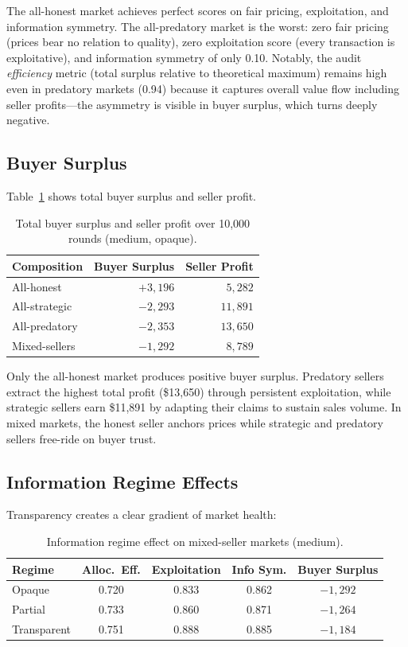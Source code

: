 \documentclass[11pt]{article}
\begin{document}
The all-honest market achieves perfect scores on fair pricing, exploitation, and information symmetry.
The all-predatory market is the worst: zero fair pricing (prices bear no relation to quality), zero exploitation score (every transaction is exploitative), and information symmetry of only 0.10.
Notably, the audit \emph{efficiency} metric (total surplus relative to theoretical maximum) remains high even in predatory markets (0.94) because it captures overall value flow including seller profits---the asymmetry is visible in buyer surplus, which turns deeply negative.

\subsection{Buyer Surplus}

Table~\ref{tab:surplus} shows total buyer surplus and seller profit.

\begin{table}[h]
\centering
\caption{Total buyer surplus and seller profit over 10{,}000 rounds (medium, opaque).}
\label{tab:surplus}
\begin{tabular}{lrr}
\toprule
Composition & Buyer Surplus & Seller Profit \\
\midrule
All-honest    & $+3{,}196$ & $5{,}282$ \\
All-strategic & $-2{,}293$ & $11{,}891$ \\
All-predatory & $-2{,}353$ & $13{,}650$ \\
Mixed-sellers & $-1{,}292$ & $8{,}789$ \\
\bottomrule
\end{tabular}
\end{table}

Only the all-honest market produces positive buyer surplus.
Predatory sellers extract the highest total profit (\$13{,}650) through persistent exploitation, while strategic sellers earn \$11{,}891 by adapting their claims to sustain sales volume.
In mixed markets, the honest seller anchors prices while strategic and predatory sellers free-ride on buyer trust.

\subsection{Information Regime Effects}

Transparency creates a clear gradient of market health:

\begin{table}[h]
\centering
\caption{Information regime effect on mixed-seller markets (medium).}
\label{tab:regime}
\begin{tabular}{lcccc}
\toprule
Regime & Alloc.\ Eff. & Exploitation & Info Sym. & Buyer Surplus \\
\midrule
Opaque      & 0.720 & 0.833 & 0.862 & $-1{,}292$ \\
Partial     & 0.733 & 0.860 & 0.871 & $-1{,}264$ \\
Transparent & 0.751 & 0.888 & 0.885 & $-1{,}184$ \\
\bottomrule
\end{tabular}
\end{table}
\end{document}
